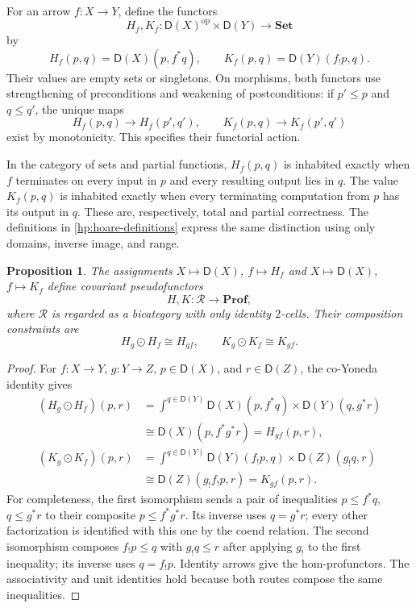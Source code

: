 \documentclass[11pt]{article}
\newtheorem{proposition}[theorem]{Proposition}
\theoremstyle{definition}
\theoremstyle{remark}
\newcommand{\R}{\mathscr R}
\newcommand{\D}{\mathsf D}
\newcommand{\Set}{\mathbf{Set}}
\newcommand{\Prof}{\mathbf{Prof}}
\newcommand{\op}{\mathrm{op}}
\begin{document}
For an arrow $f:X\to Y$, define the functors
\begin{equation}\label{hp:hoare-types}
 H_f,K_f:\D(X)^{\op}\times\D(Y)\longrightarrow\Set
\end{equation}
by
\begin{equation}\label{hp:hoare-definitions}
 H_f(p,q)=\D(X)(p,f^*q),\qquad
 K_f(p,q)=\D(Y)(f_!p,q).
\end{equation}
Their values are empty sets or singletons. On morphisms, both functors
use strengthening of preconditions and weakening of postconditions:
if $p'\le p$ and $q\le q'$, the unique maps
\[
 H_f(p,q)\longrightarrow H_f(p',q'),\qquad
 K_f(p,q)\longrightarrow K_f(p',q')
\]
exist by monotonicity. This specifies their functorial action.

In the category of sets and partial functions, $H_f(p,q)$ is inhabited
exactly when $f$ terminates on every input in $p$ and every resulting
output lies in $q$. The value $K_f(p,q)$ is inhabited exactly when every
terminating computation from $p$ has its output in $q$. These are,
respectively, total and partial correctness. The definitions in
\eqref{hp:hoare-definitions} express the same distinction using only
domains, inverse image, and range.

\begin{proposition}\label{hp:hoare-composition}
The assignments $X\mapsto\D(X)$, $f\mapsto H_f$ and
$X\mapsto\D(X)$, $f\mapsto K_f$ define covariant pseudofunctors
\[
 H,K:\R\longrightarrow\Prof,
\]
where $\R$ is regarded as a bicategory with only identity $2$-cells.
Their composition constraints are
\[
 H_g\odot H_f\cong H_{gf},\qquad
 K_g\odot K_f\cong K_{gf}.
\]
\end{proposition}
\begin{proof}
For $f:X\to Y$, $g:Y\to Z$, $p\in\D(X)$, and $r\in\D(Z)$,
the co-Yoneda identity gives
\begin{align*}
 (H_g\odot H_f)(p,r)
 &=\int^{q\in\D(Y)}\D(X)(p,f^*q)\times\D(Y)(q,g^*r)\\
 &\cong\D(X)(p,f^*g^*r)=H_{gf}(p,r),\\
 (K_g\odot K_f)(p,r)
 &=\int^{q\in\D(Y)}\D(Y)(f_!p,q)\times\D(Z)(g_!q,r)\\
 &\cong\D(Z)(g_!f_!p,r)=K_{gf}(p,r).
\end{align*}
For completeness, the first isomorphism sends a pair of inequalities
$p\le f^*q$, $q\le g^*r$ to their composite
$p\le f^*g^*r$. Its inverse uses $q=g^*r$; every other factorization
is identified with this one by the coend relation. The second
isomorphism composes $f_!p\le q$ with $g_!q\le r$ after applying
$g_!$ to the first inequality; its inverse uses $q=f_!p$.
Identity arrows give the hom-profunctors. The associativity and unit
identities hold because both routes compose the same inequalities.
\end{proof}
\end{document}
